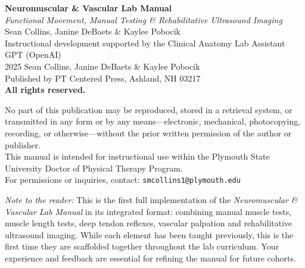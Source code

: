 \thispagestyle{empty}
\vspace*{3cm}

\begin{center}
\textbf{Neuromuscular \& Vascular Lab Manual} \\
\textit{Functional Movement, Manual Testing \& Rehabilitative Ultrasound Imaging} \\[1em]

Sean Collins, Janine DeBaets \& Kaylee Pobocik \\
Instructional development supported by the Clinical Anatomy Lab Assistant GPT (OpenAI) \\[3em]

\textcopyright{} 2025 Sean Collins, Janine DeBaets \& Kaylee Pobocik \\
Published by PT Centered Press, Ashland, NH 03217 \\[1em]

\textbf{All rights reserved.}

No part of this publication may be reproduced, stored in a retrieval system, or transmitted in any form or by any means—electronic, mechanical, photocopying, recording, or otherwise—without the prior written permission of the author or publisher. \\[2em]

This manual is intended for instructional use within the Plymouth State University Doctor of Physical Therapy Program. \\
For permissions or inquiries, contact: \texttt{smcollins1@plymouth.edu}
\end{center}

\vspace{2em}
\noindent\textit{Note to the reader:} This is the first full implementation of the \textit{Neuromuscular \& Vascular Lab Manual} in its integrated format: combining manual muscle tests, muscle length tests, deep tendon reflexes, vascular palpation and rehabilitative ultrasound imaging. While each element has been taught previously, this is the first time they are scaffolded together throughout the lab curriculum. Your experience and feedback are essential for refining the manual for future cohorts.

\vfill